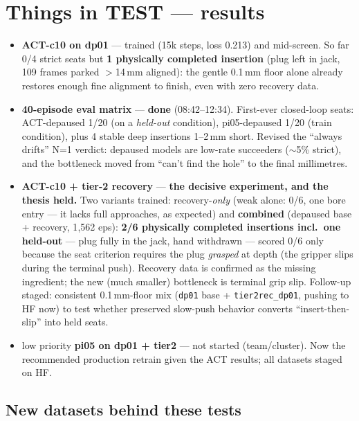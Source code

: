 \section{\color{cmured} \textbf{Things in TEST --- results}}

\begin{itemize}
    \item \textbf{ACT-c10 on dp01} --- trained (15k steps, loss 0.213) and mid-screen.
    So far 0/4 strict seats but \textbf{1 physically completed insertion}
    (plug left in jack, 109 frames parked $>$14\,mm aligned): the gentle 0.1\,mm
    floor alone already restores enough fine alignment to finish, even with zero
    recovery data.

    \item \textbf{40-episode eval matrix} --- \textbf{done} (08:42--12:34).
    First-ever closed-loop seats: ACT-depaused 1/20 (on a \emph{held-out}
    condition), pi05-depaused 1/20 (train condition), plus 4 stable deep
    insertions 1--2\,mm short. Revised the ``always drifts'' N=1 verdict:
    depaused models are low-rate succeeders ($\sim$5\% strict), and the
    bottleneck moved from ``can't find the hole'' to the final millimetres.

    \item \textbf{ACT-c10 + tier-2 recovery} --- \textbf{the decisive experiment,
    and the thesis held.} Two variants trained: recovery-\emph{only}
    (weak alone: 0/6, one bore entry --- it lacks full approaches, as expected)
    and \textbf{combined} (depaused base + recovery, 1{,}562 eps):
    \textbf{2/6 physically completed insertions incl.\ one held-out} ---
    plug fully in the jack, hand withdrawn --- scored 0/6 only because the
    seat criterion requires the plug \emph{grasped} at depth (the gripper slips
    during the terminal push). Recovery data is confirmed as the missing
    ingredient; the new (much smaller) bottleneck is terminal grip slip.
    Follow-up staged: consistent 0.1\,mm-floor mix
    (\texttt{dp01} base + \texttt{tier2rec\_dp01}, pushing to HF now) to test
    whether preserved slow-push behavior converts ``insert-then-slip'' into held
    seats.

    \item {\color{cmured}low priority} \textbf{pi05 on dp01 + tier2} --- not
    started (team/cluster). Now the recommended production retrain given the
    ACT results; all datasets staged on HF.
\end{itemize}

\subsection*{\color{cmured} New datasets behind these tests}

